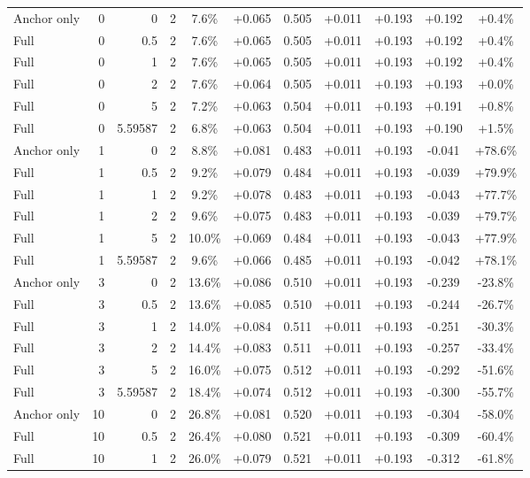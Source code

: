 \begin{table}[htbp]
\begin{tabular}{lrrrccccccc}
Anchor only & 0 & 0 & 2 & 7.6\% & +0.065 & 0.505 & +0.011 & +0.193 & +0.192 & +0.4\% \\
Full & 0 & 0.5 & 2 & 7.6\% & +0.065 & 0.505 & +0.011 & +0.193 & +0.192 & +0.4\% \\
Full & 0 & 1 & 2 & 7.6\% & +0.065 & 0.505 & +0.011 & +0.193 & +0.192 & +0.4\% \\
Full & 0 & 2 & 2 & 7.6\% & +0.064 & 0.505 & +0.011 & +0.193 & +0.193 & +0.0\% \\
Full & 0 & 5 & 2 & 7.2\% & +0.063 & 0.504 & +0.011 & +0.193 & +0.191 & +0.8\% \\
Full & 0 & 5.59587 & 2 & 6.8\% & +0.063 & 0.504 & +0.011 & +0.193 & +0.190 & +1.5\% \\
Anchor only & 1 & 0 & 2 & 8.8\% & +0.081 & 0.483 & +0.011 & +0.193 & -0.041 & +78.6\% \\
Full & 1 & 0.5 & 2 & 9.2\% & +0.079 & 0.484 & +0.011 & +0.193 & -0.039 & +79.9\% \\
Full & 1 & 1 & 2 & 9.2\% & +0.078 & 0.483 & +0.011 & +0.193 & -0.043 & +77.7\% \\
Full & 1 & 2 & 2 & 9.6\% & +0.075 & 0.483 & +0.011 & +0.193 & -0.039 & +79.7\% \\
Full & 1 & 5 & 2 & 10.0\% & +0.069 & 0.484 & +0.011 & +0.193 & -0.043 & +77.9\% \\
Full & 1 & 5.59587 & 2 & 9.6\% & +0.066 & 0.485 & +0.011 & +0.193 & -0.042 & +78.1\% \\
Anchor only & 3 & 0 & 2 & 13.6\% & +0.086 & 0.510 & +0.011 & +0.193 & -0.239 & -23.8\% \\
Full & 3 & 0.5 & 2 & 13.6\% & +0.085 & 0.510 & +0.011 & +0.193 & -0.244 & -26.7\% \\
Full & 3 & 1 & 2 & 14.0\% & +0.084 & 0.511 & +0.011 & +0.193 & -0.251 & -30.3\% \\
Full & 3 & 2 & 2 & 14.4\% & +0.083 & 0.511 & +0.011 & +0.193 & -0.257 & -33.4\% \\
Full & 3 & 5 & 2 & 16.0\% & +0.075 & 0.512 & +0.011 & +0.193 & -0.292 & -51.6\% \\
Full & 3 & 5.59587 & 2 & 18.4\% & +0.074 & 0.512 & +0.011 & +0.193 & -0.300 & -55.7\% \\
Anchor only & 10 & 0 & 2 & 26.8\% & +0.081 & 0.520 & +0.011 & +0.193 & -0.304 & -58.0\% \\
Full & 10 & 0.5 & 2 & 26.4\% & +0.080 & 0.521 & +0.011 & +0.193 & -0.309 & -60.4\% \\
Full & 10 & 1 & 2 & 26.0\% & +0.079 & 0.521 & +0.011 & +0.193 & -0.312 & -61.8\% \\

\end{tabular}
\end{table}
